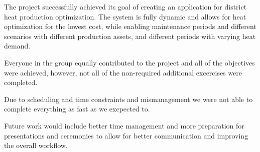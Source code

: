 

The project successfully achieved its goal of creating an application for district heat production optimization.
The system is fully dynamic and allows for heat optimization for the lowest cost, while enabling maintenance periods and different scenarios with different production assets, and different periods with varying heat demand. 

Everyone in the group equally contributed to the project and all of the objectives were achieved, however, not all of the non-required additional excercises were completed.

Due to scheduling and time constraints and mismanagement we were not able to complete everything as fast as we excpected to.

Future work would include better time management and more preparation for presentations and ceremonies to allow for better communication and improving the overall workflow.